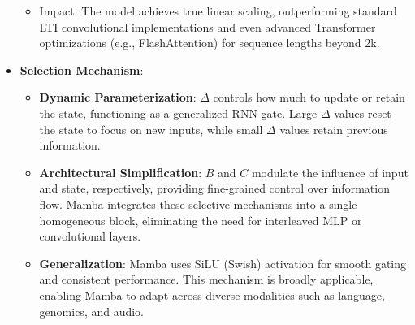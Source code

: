 \documentclass[onecolumn]{IEEEtran}
\begin{document}
\begin{itemize}
\begin{itemize}
\begin{itemize}
            \end{itemize}
            \item Impact: The model achieves true linear scaling, outperforming standard LTI convolutional implementations and even advanced Transformer optimizations (e.g., FlashAttention) for sequence lengths beyond 2k.
        \end{itemize}
    \item \textbf{Selection Mechanism}:
        \begin{itemize}
            \item \textbf{Dynamic Parameterization}: $\Delta$ controls how much to update or retain the state, functioning as a generalized RNN gate. Large $\Delta$ values reset the state to focus on new inputs, while small $\Delta$ values retain previous information.
            \item \textbf{Architectural Simplification}: $B$ and $C$ modulate the influence of input and state, respectively, providing fine-grained control over information flow. Mamba integrates these selective mechanisms into a single homogeneous block, eliminating the need for interleaved MLP or convolutional layers.
            \item \textbf{Generalization}: Mamba uses SiLU (Swish) activation for smooth gating and consistent performance. This mechanism is broadly applicable, enabling Mamba to adapt across diverse modalities such as language, genomics, and audio.
        \end{itemize}
\end{itemize}
\end{document}
